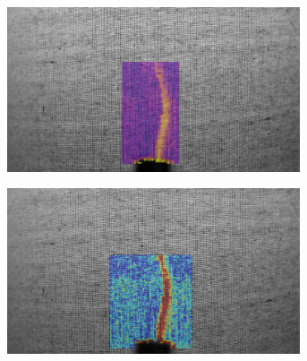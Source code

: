 \documentclass[letterpaper,12pt]{article}
\begin{document}
\begin{figure}[h]
    \centering
    \begin{subfigure}[b]{0.45\textwidth}
    	\centering
        \includegraphics[width=0.95\textwidth]{Python_LighterFluid.PNG}
        \caption{}
        \label{fig:Python_PreLighter_DSLR}
    \end{subfigure}
    \begin{subfigure}[b]{0.45\textwidth}
    	\centering
        \includegraphics[width=0.95\textwidth]{MATLAB_LighterFluid.PNG}
        \caption{}
        \label{fig:MATLAB_PreLighter_DSLR}
    \end{subfigure}
    

\end{figure}
\end{document}
